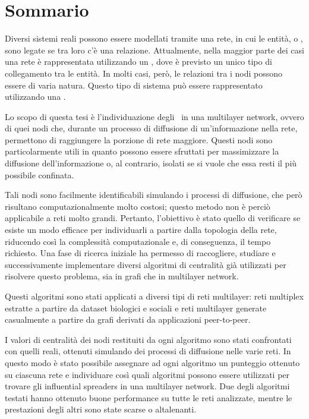 \setlength{\parskip}{1em}

\chapter*{Sommario} %
\label{sommario}


Diversi sistemi reali possono essere modellati tramite una rete, in cui
le entità, o \nodi, sono legate se tra loro c'è una relazione.
Attualmente, nella maggior parte dei casi una rete è rappresentata utilizzando 
un \grafo, dove è previsto un unico tipo di collegamento tra le entità.
In molti casi, però, le relazioni tra i nodi possono essere di varia natura. 
Questo tipo di sistema può essere rappresentato utilizzando una 
\muln.

Lo scopo di questa tesi è l'individuazione degli \infsp\ in una multilayer network, 
ovvero di quei nodi che, durante un processo di diffusione di 
un'informazione nella rete, permettono di raggiungere la porzione di rete maggiore. 
Questi nodi sono particolarmente utili in quanto possono essere sfruttati per 
massimizzare la diffusione dell'informazione o, al contrario, 
isolati se si vuole che essa resti il più possibile confinata.

Tali nodi sono facilmente identificabili simulando i processi di diffusione, 
che però risultano computazionalmente molto costosi; questo metodo non 
è perciò applicabile a reti molto grandi.
Pertanto, l'obiettivo è stato quello di verificare se esiste un modo efficace per 
individuarli a partire dalla topologia della rete, riducendo così la complessità computazionale 
e, di conseguenza, il tempo richiesto.
Una fase di ricerca iniziale ha permesso di raccogliere, studiare 
e successivamente implementare diversi 
algoritmi di centralità già utilizzati per risolvere questo problema, 
sia in grafi che in multilayer network.

Questi algoritmi sono stati applicati a diversi tipi di reti multilayer:
reti multiplex estratte a partire da dataset biologici e 
sociali e reti multilayer generate casualmente 
a partire da grafi derivati da applicazioni peer-to-peer.

I valori di centralità dei nodi restituiti da ogni algoritmo sono stati 
confrontati con quelli reali, ottenuti simulando dei processi di diffusione
nelle varie reti. In questo modo è stato possibile assegnare ad ogni algoritmo
un punteggio ottenuto su ciascuna rete e individuare così quali algoritmi
possono essere utilizzati per trovare gli influential spreaders in una multilayer network.
Due degli algoritmi testati hanno ottenuto buone performance su tutte le
reti analizzate, mentre le prestazioni degli altri sono state scarse o altalenanti.

